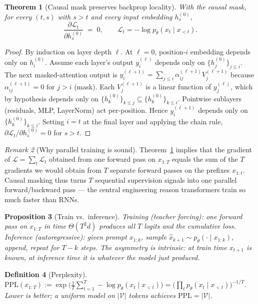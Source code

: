 \documentclass[11pt]{article}
\newtheorem{theorem}{Theorem}[section]
\newtheorem{definition}[theorem]{Definition}
\newtheorem{proposition}[theorem]{Proposition}
\theoremstyle{remark}
\newtheorem{remark}[theorem]{Remark}
\begin{document}
\begin{theorem}[Causal mask preserves backprop locality]\label{thm:locality}
With the causal mask, for every $(t,s)$ with $s>t$ and every input embedding $h^{(0)}_s$,
\[
  \frac{\partial \mathcal{L}_t}{\partial h^{(0)}_s} \;=\; 0,\qquad \mathcal{L}_t = -\log p_\theta(x_t\mid x_{<t}).
\]
\end{theorem}
\begin{proof}
By induction on layer depth $\ell$. At $\ell=0$, position-$i$ embedding depends only on $h^{(0)}_i$. Assume each layer's output $y^{(\ell)}_i$ depends only on $\{h^{(0)}_j\}_{j\le i}$. The next masked-attention output is
$y^{(\ell+1)}_i = \sum_{j\le i} \alpha^{(\ell+1)}_{ij} V^{(\ell+1)}_j$ because $\alpha^{(\ell+1)}_{ij} = 0$ for $j>i$ (mask). Each $V^{(\ell+1)}_j$ is a linear function of $y^{(\ell)}_j$, which by hypothesis depends only on $\{h^{(0)}_k\}_{k\le j} \subseteq \{h^{(0)}_k\}_{k\le i}$. Pointwise sublayers (residuals, MLP, LayerNorm) act per-position. Hence $y^{(\ell+1)}_i$ depends only on $\{h^{(0)}_k\}_{k\le i}$. Setting $i=t$ at the final layer and applying the chain rule, $\partial \mathcal{L}_t/\partial h^{(0)}_s = 0$ for $s>t$.
\end{proof}

\begin{remark}[Why parallel training is sound]
Theorem~\ref{thm:locality} implies that the gradient of $\mathcal{L} = \sum_t \mathcal{L}_t$ obtained from one forward pass on $x_{1:T}$ equals the sum of the $T$ gradients we would obtain from $T$ separate forward passes on the prefixes $x_{1:t}$. Causal masking thus turns $T$ sequential supervision signals into one parallel forward/backward pass --- the central engineering reason transformers train so much faster than RNNs.
\end{remark}

\begin{proposition}[Train vs.\ inference]
Training (teacher forcing): one forward pass on $x_{1:T}$ in time $\Theta(T^2 d)$ produces all $T$ logits and the cumulative loss.
Inference (autoregressive): given prompt $x_{1:k}$, sample $\hat x_{k+1}\sim p_\theta(\cdot\mid x_{1:k})$, append, repeat for $T-k$ steps. The asymmetry is intrinsic: at train time $x_{t+1}$ is known, at inference time it is whatever the model just produced.
\end{proposition}

\begin{definition}[Perplexity]
$\mathrm{PPL}(x_{1:T}) := \exp\!\Big(\frac{1}{T}\sum_{t=1}^T -\log p_\theta(x_t\mid x_{<t})\Big) = \big(\prod_t p_\theta(x_t\mid x_{<t})\big)^{-1/T}$. Lower is better; a uniform model on $|\mathcal{V}|$ tokens achieves $\mathrm{PPL} = |\mathcal{V}|$.
\end{definition}
\end{document}
